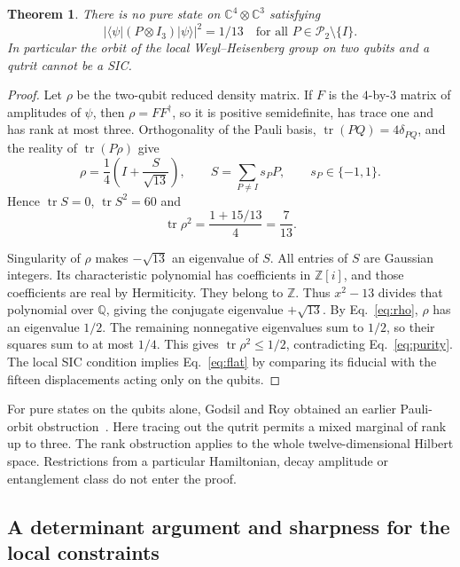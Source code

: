 \documentclass[11pt]{article}
\newtheorem{theorem}{Theorem}
\newcommand{\CC}{\mathbb C}\newcommand{\ZZ}{\mathbb Z}\newcommand{\RR}{\mathbb R}
\newcommand{\tr}{\operatorname{tr}}\newcommand{\rank}{\operatorname{rank}}
\newcommand{\cP}{\mathcal P}\newcommand{\one}{\mathbf 1}
\begin{document}
\begin{theorem}\label{th:no}
There is no pure state on $\CC^4\otimes\CC^3$ satisfying
\begin{equation}
  |\langle\psi|(P\otimes I_3)|\psi\rangle|^2=1/13
       \quad\text{for all } P\in\cP_2\setminus\{I\}.              \label{eq:flat}
\end{equation}
In particular the orbit of the local Weyl--Heisenberg group on two qubits and a qutrit cannot be a SIC.
\end{theorem}
\begin{proof}
Let $\rho$ be the two-qubit reduced density matrix. If $F$ is the $4$-by-$3$ matrix of amplitudes of $\psi$, then $\rho=FF^\dagger$, so it is positive semidefinite, has trace one and has rank at most three. Orthogonality of the Pauli basis, $\tr(PQ)=4\delta_{PQ}$, and the reality of $\tr(P\rho)$ give
\begin{equation}
 \rho=\frac14\left(I+\frac{S}{\sqrt{13}}\right),
 \qquad S=\sum_{P\ne I}s_P P,\qquad s_P\in\{-1,1\}.
 \label{eq:rho}
\end{equation}
Hence $\tr S=0$, $\tr S^2=60$ and
\begin{equation}
                    \tr\rho^2=\frac{1+15/13}{4}=\frac7{13}.
                    \label{eq:purity}
\end{equation}

Singularity of $\rho$ makes $-\sqrt{13}$ an eigenvalue of $S$. All entries of $S$ are Gaussian integers. Its characteristic polynomial has coefficients in $\ZZ[i]$, and those coefficients are real by Hermiticity. They belong to $\ZZ$. Thus $x^2-13$ divides that polynomial over $\mathbb Q$, giving the conjugate eigenvalue $+\sqrt{13}$. By Eq.~\eqref{eq:rho}, $\rho$ has an eigenvalue $1/2$. The remaining nonnegative eigenvalues sum to $1/2$, so their squares sum to at most $1/4$. This gives $\tr\rho^2\leq1/2$, contradicting Eq.~\eqref{eq:purity}. The local SIC condition implies Eq.~\eqref{eq:flat} by comparing its fiducial with the fifteen displacements acting only on the qubits.
\end{proof}

For pure states on the qubits alone, Godsil and Roy obtained an earlier Pauli-orbit obstruction~\cite[Lemma~3.1]{godsil}. Here tracing out the qutrit permits a mixed marginal of rank up to three. The rank obstruction applies to the whole twelve-dimensional Hilbert space. Restrictions from a particular Hamiltonian, decay amplitude or entanglement class do not enter the proof.

\subsection{A determinant argument and sharpness for the local constraints}
\end{document}
